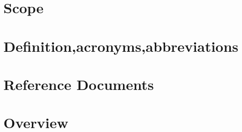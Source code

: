 \renewcommand{\thesection}{\Alph{section}}
\section{Scope}\label{sec:scope}
\section{Definition,acronyms,abbreviations}\label{sec:definition,acronyms,abbreviations}
\section{Reference Documents}\label{sec:reference documents}
\section{Overview}\label{sec:overview}